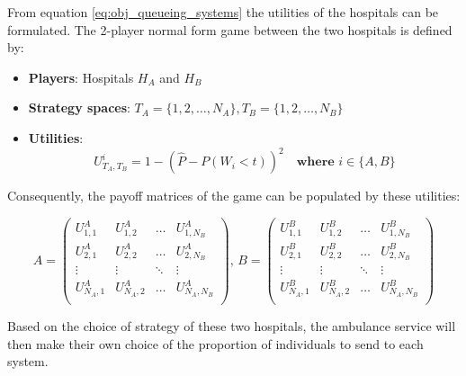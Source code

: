 From equation \ref{eq:obj_queueing_systems} the utilities of the
hospitals can be formulated.
The 2-player normal form game between the two hospitals is defined by:
\begin{itemize}
    \item \textbf{Players}: Hospitals \(H_A\) and \(H_B\)
    \item \textbf{Strategy spaces}: \(T_A = \{1, 2, \dots, N_A\}, 
    T_B = \{1, 2, \dots, N_B\}\)
    \item \textbf{Utilities}:    
    \begin{equation} \label{eq:payoff_entry}
        U_{T_A, T_B}^i = 1 - \left( \hat{P} - P(W_i < t) \right)^2 \quad
        \textbf{where } i \in \{A, B\}
    \end{equation}
\end{itemize}

Consequently, the payoff matrices of the game can be populated by these 
utilities:

\begin{equation} \label{eq:payoff_matrices}
    A = 
    \begin{pmatrix}
        U_{1,1}^A & U_{1,2}^A & \dots & U_{1,N_B}^A \\
        U_{2,1}^A & U_{2,2}^A & \dots & U_{2,N_B}^A \\
        \vdots & \vdots & \ddots & \vdots \\
        U_{N_A,1}^A & U_{N_A,2}^A & \dots & U_{N_A,N_B}^A \\
    \end{pmatrix}, \,
    B = 
    \begin{pmatrix}
        U_{1,1}^B & U_{1,2}^B & \dots & U_{1,N_B}^B \\
        U_{2,1}^B & U_{2,2}^B & \dots & U_{2,N_B}^B \\
        \vdots & \vdots & \ddots & \vdots \\
        U_{N_A,1}^B & U_{N_A,2}^B & \dots & U_{N_A,N_B}^B \\
    \end{pmatrix}
\end{equation}

Based on the choice of strategy of these two hospitals, the ambulance service 
will then make their own choice of the proportion of individuals to send to
each system.




